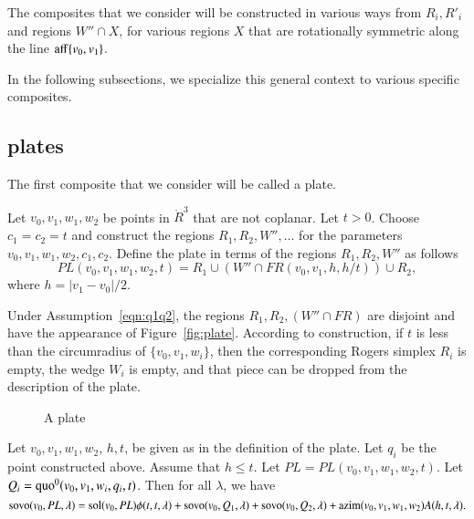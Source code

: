 The composites that we consider will be constructed in various
ways from $R_i,R'_i$ and regions $W''\cap X$, for various regions
$X$ that are rotationally symmetric along the line ${\operatorname{aff}}\{v_0,v_1\}$.


In the following subsections, we specialize this general
context to various specific composites.

\subsection{plates}

The first composite that we consider will be called a plate.

\begin{definition}
Let $v_0,v_1,w_1,w_2$ be points in $\ring{R}^3$ that are not
coplanar.  Let $t > 0$.  Choose $c_1=c_2=t$ and construct
the regions $R_1,R_2,W'',\ldots$ for the parameters 
$v_0,v_1,w_1,w_2,c_1,c_2$.
Define the plate in terms of the regions $R_1,R_2,W''$ as follows
  $$
  PL(v_0,v_1,w_1,w_2,t) = 
  R_1 \cup (W''\cap FR(v_0,v_1,h,h/t))\cup R_2,
  $$
where $h = |v_1-v_0|/2$.
\end{definition}

Under Assumption~\ref{eqn:q1q2}, the regions $R_1,R_2,(W''\cap FR)$
are disjoint and have the appearance of Figure~\ref{fig:plate}.
According to construction, if $t$ is less than the circumradius
of $\{v_0,v_1,w_i\}$, then the corresponding Rogers simplex $R_i$
is empty, the wedge $W_i$ is empty, and that piece can be dropped
from the description of the plate.

\begin{figure}[htb]
  \centering
  \caption{A plate}
\end{figure}


\begin{lemma}
Let $v_0,v_1,w_1,w_2$, $h,t$, be given as in the definition of
the plate. Let $q_i$ be the point constructed above. 
Assume that $h\le t$.  
Let $PL=PL(v_0,v_1,w_1,w_2,t)$.
Let $Q_i=\operatorname{quo}^0(v_0,v_1,w_i,q_i,t)$.
Then for all $\lambda$, we have
  $$
  {\operatorname{sovo}}(v_0,PL,\lambda) = 
  \operatorname{sol}(v_0,PL)\phi(t,t,\lambda) + {\operatorname{sovo}}(v_0,Q_1,\lambda) +
  {\operatorname{sovo}}(v_0,Q_2,\lambda) +
  {\operatorname{azim}}(v_0,v_1,w_1,w_2) A(h,t,\lambda).
  $$
\end{lemma}

